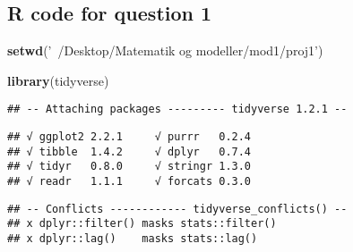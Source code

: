 \documentclass[]{article}
\title{}
\author{}
\date{}
\newenvironment{Shaded}{\begin{snugshade}}{\end{snugshade}}
\newcommand{\KeywordTok}[1]{\textcolor[rgb]{0.13,0.29,0.53}{\textbf{#1}}}
\newcommand{\StringTok}[1]{\textcolor[rgb]{0.31,0.60,0.02}{#1}}
\newcommand{\NormalTok}[1]{#1}
\begin{document}
\subsection{R code for question 1}\label{r-code-for-question-1}

\begin{Shaded}
\begin{Highlighting}[]
\KeywordTok{setwd}\NormalTok{(}\StringTok{'~/Desktop/Matematik og modeller/mod1/proj1'}\NormalTok{)}

\KeywordTok{library}\NormalTok{(tidyverse)}
\end{Highlighting}
\end{Shaded}

\begin{verbatim}
## -- Attaching packages --------- tidyverse 1.2.1 --
\end{verbatim}

\begin{verbatim}
## √ ggplot2 2.2.1     √ purrr   0.2.4
## √ tibble  1.4.2     √ dplyr   0.7.4
## √ tidyr   0.8.0     √ stringr 1.3.0
## √ readr   1.1.1     √ forcats 0.3.0
\end{verbatim}

\begin{verbatim}
## -- Conflicts ------------ tidyverse_conflicts() --
## x dplyr::filter() masks stats::filter()
## x dplyr::lag()    masks stats::lag()
\end{verbatim}
\end{document}
